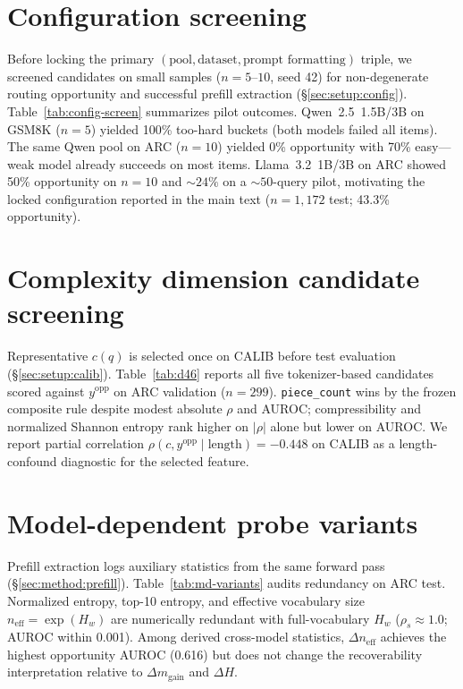 
\section{Configuration screening}
\label{app:validation}

Before locking the primary $(\text{pool}, \text{dataset}, \text{prompt formatting})$ triple, we screened candidates on small samples ($n{=}5$--$10$, seed 42) for non-degenerate routing opportunity and successful prefill extraction (\S\ref{sec:setup:config}).
Table~\ref{tab:config-screen} summarizes pilot outcomes.
Qwen~2.5~1.5B/3B on GSM8K ($n{=}5$) yielded 100\% too-hard buckets (both models failed all items).
The same Qwen pool on ARC ($n{=}10$) yielded 0\% opportunity with 70\% easy---weak model already succeeds on most items.
Llama~3.2~1B/3B on ARC showed 50\% opportunity on $n{=}10$ and ${\sim}24\%$ on a ${\sim}50$-query pilot, motivating the locked configuration reported in the main text ($n{=}1{,}172$ test; 43.3\% opportunity).



\section{Complexity dimension candidate screening}
\label{app:d46}

Representative $c(q)$ is selected once on CALIB before test evaluation (\S\ref{sec:setup:calib}).
Table~\ref{tab:d46} reports all five tokenizer-based candidates scored against $y^{\text{opp}}$ on ARC validation ($n{=}299$).
\texttt{piece\_count} wins by the frozen composite rule despite modest absolute $\rho$ and AUROC; compressibility and normalized Shannon entropy rank higher on $|\rho|$ alone but lower on AUROC.
We report partial correlation $\rho(c,y^{\text{opp}}\mid\text{length})=-0.448$ on CALIB as a length-confound diagnostic for the selected feature.



\section{Model-dependent probe variants}
\label{app:md-variants}

Prefill extraction logs auxiliary statistics from the same forward pass (\S\ref{sec:method:prefill}).
Table~\ref{tab:md-variants} audits redundancy on ARC test.
Normalized entropy, top-10 entropy, and effective vocabulary size $n_{\mathrm{eff}}=\exp(H_w)$ are numerically redundant with full-vocabulary $H_w$ ($\rho_s{\approx}1.0$; AUROC within 0.001).
Among derived cross-model statistics, $\Delta n_{\mathrm{eff}}$ achieves the highest opportunity AUROC (0.616) but does not change the recoverability interpretation relative to $\Delta m_{\mathrm{gain}}$ and $\Delta H$.

